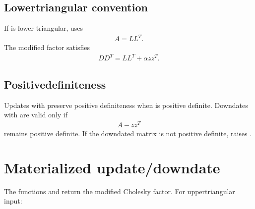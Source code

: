 \documentclass[a4paper,11pt,english]{sphinxmanual}
\begin{document}
\subsection{Lower\sphinxhyphen{}triangular convention}
\label{\detokenize{manual:lower-triangular-convention}}
\sphinxAtStartPar
If  is lower triangular,  uses
\begin{equation*}
\begin{split}A = L L^T.\end{split}
\end{equation*}
\sphinxAtStartPar
The modified factor  satisfies
\begin{equation*}
\begin{split}D D^T = L L^T + \alpha z z^T.\end{split}
\end{equation*}

\subsection{Positive\sphinxhyphen{}definiteness}
\label{\detokenize{manual:positive-definiteness}}
\sphinxAtStartPar
Updates with  preserve positive definiteness when  is
positive definite.  Downdates with  are valid only if
\begin{equation*}
\begin{split}A - z z^T\end{split}
\end{equation*}
\sphinxAtStartPar
remains positive definite.  If the downdated matrix is not positive definite,
 raises .


\section{Materialized update/downdate}
\label{\detokenize{manual:materialized-update-downdate}}
\sphinxAtStartPar
The functions  and  return the modified Cholesky factor.
For upper\sphinxhyphen{}triangular input:

\begin{sphinxVerbatim}[commandchars=\\\{\}]
   
\end{sphinxVerbatim}
\end{document}

